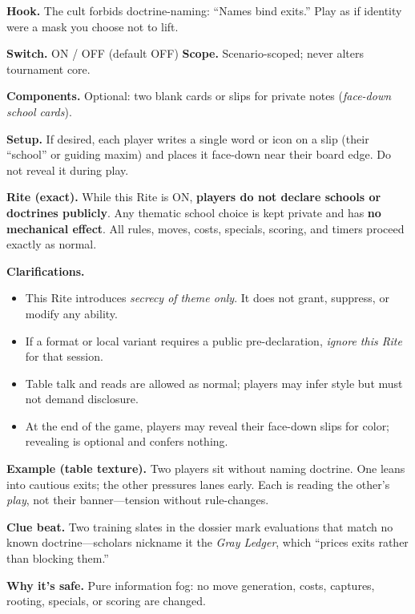 \documentclass[11pt]{article}
\begin{document}
\noindent\textbf{Hook.} The cult forbids doctrine-naming: “Names bind exits.” Play as if identity were a mask you choose not to lift.

\medskip
\noindent\textbf{Switch.} \textsc{ON / OFF} (default \textsc{OFF}) \hfill \textbf{Scope.} Scenario-scoped; never alters tournament core.

\medskip
\noindent\textbf{Components.} Optional: two blank cards or slips for private notes (\emph{face-down school cards}).

\medskip
\noindent\textbf{Setup.} If desired, each player writes a single word or icon on a slip (their “school” or guiding maxim) and places it face-down near their board edge. Do not reveal it during play.

\medskip
\noindent\textbf{Rite (exact).} While this Rite is \textsc{ON}, \textbf{players do not declare schools or doctrines publicly}. Any thematic school choice is kept private and has \textbf{no mechanical effect}. All rules, moves, costs, specials, scoring, and timers proceed exactly as normal.

\medskip
\noindent\textbf{Clarifications.}
\begin{itemize}\setlength\itemsep{0.25em}
  \item This Rite introduces \emph{secrecy of theme only}. It does not grant, suppress, or modify any ability.
  \item If a format or local variant requires a public pre-declaration, \emph{ignore this Rite} for that session.
  \item Table talk and reads are allowed as normal; players may infer style but must not demand disclosure.
  \item At the end of the game, players may reveal their face-down slips for color; revealing is optional and confers nothing.
\end{itemize}

\medskip
\noindent\textbf{Example (table texture).}  
Two players sit without naming doctrine. One leans into cautious exits; the other pressures lanes early. Each is reading the other’s \emph{play}, not their banner—tension without rule-changes.

\medskip
\noindent\textbf{Clue beat.} Two training slates in the dossier mark evaluations that match no known doctrine—scholars nickname it the \emph{Gray Ledger}, which “prices exits rather than blocking them.”

\medskip
\noindent\textbf{Why it’s safe.} Pure information fog: no move generation, costs, captures, rooting, specials, or scoring are changed.
\end{document}
